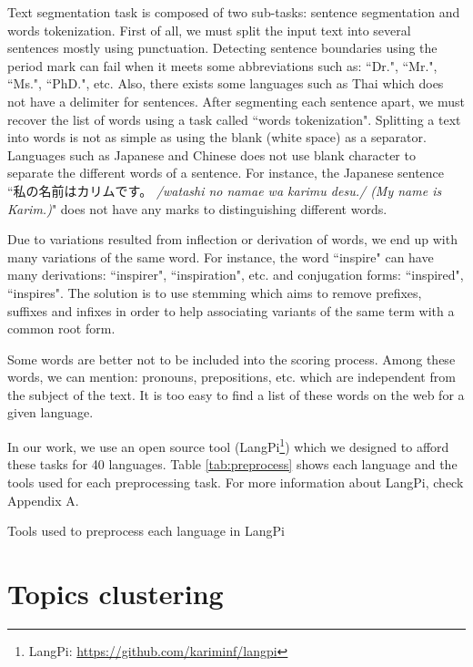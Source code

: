 Text segmentation task is composed of two sub-tasks: sentence segmentation and words tokenization.
First of all, we must split the input text into several sentences mostly using punctuation. 
Detecting sentence boundaries using the period mark can fail when it meets some abbreviations such as: ``Dr.", ``Mr.", ``Ms.", ``PhD.", etc. 
Also, there exists some languages such as Thai which does not have a delimiter for sentences.
After segmenting each sentence apart, we must recover the list of words using a task called ``words tokenization".
Splitting a text into words is not as simple as using the blank (white space) as a separator. 
Languages such as Japanese and Chinese does not use blank character to separate the different words of a sentence. 
For instance, the Japanese sentence ``私の名前はカリムです。 \textit{/watashi no namae wa karimu desu./ (My name is Karim.)}" does not have any marks to distinguishing different words.

Due to variations resulted from inflection or derivation of words, we end up with many variations of the same word. 
For instance, the word ``inspire" can have many derivations: ``inspirer", ``inspiration", etc. and conjugation forms: ``inspired", ``inspires".
The solution is to use stemming which aims to remove prefixes, suffixes and infixes in order to help associating variants of the same term with a common root form.

Some words are better not to be included into the scoring process.
Among these words, we can mention: pronouns, prepositions, etc. which are independent from the subject of the text.
It is too easy to find a list of these words on the web for a given language.


In our work, we use an open source tool (LangPi\footnote{LangPi: \url{https://github.com/kariminf/langpi}}) which we designed to afford these tasks for 40 languages.
Table \ref{tab:preprocess} shows each language and the tools used for each preprocessing task.
For more information about LangPi, check Appendix A.
%
\begin{table}[!ht]
	\centering
	\caption{Tools used to preprocess each language in LangPi}
	\label{tab:preprocess}
\end{table}


\section{Topics clustering}

